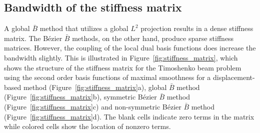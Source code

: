 \documentclass{article}
\newcommand{\Bezier}{{B\'{e}zier} }
\begin{document}
\subsection{Bandwidth of the stiffness matrix}
A global $\bar{B}$ method that utilizes a global $L^2$ projection results in a dense stiffness matrix. The B\'ezier $\bar{B}$ {methods}, on the other hand, {produce} sparse stiffness matrices. However, the coupling of the local dual basis functions does increase the bandwidth slightly. This is illustrated in Figure~\ref{fig:stiffness_matrix}, which shows the structure of the stiffness matrix for the Timoshenko beam problem using the second order basis functions of maximal smoothness for a displacement-based method (Figure~\ref{fig:stiffness_matrix}a), global $\bar{B}$ method (Figure~\ref{fig:stiffness_matrix}b), symmetric B\'ezier $\bar{B}$ method (Figure~\ref{fig:stiffness_matrix}c) and non-symmetric \Bezier $\bar{B}$ method (Figure~\ref{fig:stiffness_matrix}d). The blank cells indicate zero terms in the matrix while colored cells show the location of nonzero terms.
\end{document}
